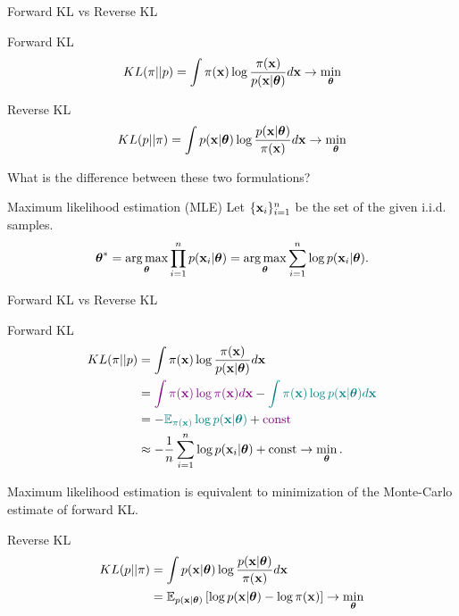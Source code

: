 \begin{frame}{Forward KL vs Reverse KL}
	\begin{block}{Forward KL}
		\vspace{-0.2cm}
		\[
		KL(\pi || p) = \int \pi (\mathbf{x}) \log \frac{\pi(\mathbf{x})}{p(\mathbf{x} | \boldsymbol{\theta})} d \mathbf{x} \rightarrow \min_{\boldsymbol{\theta}}
		\]
	\end{block}
	\begin{block}{Reverse KL}
		\vspace{-0.2cm}
		\[
		KL(p || \pi) = \int p (\mathbf{x}| \boldsymbol{\theta}) \log \frac{p(\mathbf{x}| \boldsymbol{\theta})}{\pi(\mathbf{x})} d \mathbf{x} \rightarrow \min_{\boldsymbol{\theta}}
		\]
	\end{block}
	What is the difference between these two formulations?
	
	\begin{block}{Maximum likelihood estimation (MLE)}
	Let $\{\mathbf{x}_i\}_{i=1}^n$ be the set of the given i.i.d. samples.
		\vspace{-0.3cm}
		\[
		\boldsymbol{\theta}^* = \operatorname*{arg\,max}_{\boldsymbol{\theta}} \prod_{i=1}^n p(\mathbf{x}_i | \boldsymbol{\theta}) = \operatorname*{arg\,max}_{\boldsymbol{\theta}} \sum_{i=1}^n \log p(\mathbf{x}_i | \boldsymbol{\theta}).
		\]
	\end{block}
\end{frame}
\begin{frame}{Forward KL vs Reverse KL}
	\begin{block}{Forward KL}
		\vspace{-0.5cm}
		\begin{align*}
			KL(\pi || p) &= \int \pi (\mathbf{x}) \log \frac{\pi(\mathbf{x})}{p(\mathbf{x} | \boldsymbol{\theta})} d \mathbf{x} \\
			&= {\color{violet}\int \pi (\mathbf{x}) \log \pi(\mathbf{x}) d \mathbf{x}} - {\color{teal}\int \pi (\mathbf{x}) \log p(\mathbf{x} | \boldsymbol{\theta}) d \mathbf{x}} \\
			&= - {\color{teal}\mathbb{E}_{\pi(\mathbf{x})} \log p(\mathbf{x} | \boldsymbol{\theta})} + {\color{violet}\text{const}} \\
			& \approx - \frac{1}{n} \sum_{i=1}^n \log p(\mathbf{x}_i | \boldsymbol{\theta}) + \text{const} \rightarrow \min_{\boldsymbol{\theta}}.
		\end{align*}
		\vspace{-0.5cm}
	\end{block}
	Maximum likelihood estimation is equivalent to minimization of the Monte-Carlo estimate of forward KL.
	\begin{block}{Reverse KL}
		\vspace{-0.5cm}
		\begin{align*}
			KL(p || \pi) &= \int p(\mathbf{x} | \boldsymbol{\theta}) \log \frac{p(\mathbf{x} | \boldsymbol{\theta})}{\pi(\mathbf{x})} d \mathbf{x} \\
			&= \mathbb{E}_{p(\mathbf{x} | \boldsymbol{\theta})} \left[\log p(\mathbf{x} | \boldsymbol{\theta}) - \log \pi(\mathbf{x})\right] \rightarrow \min_{\boldsymbol{\theta}}
		\end{align*}
		\vspace{-0.7cm}
	\end{block}
\end{frame}
